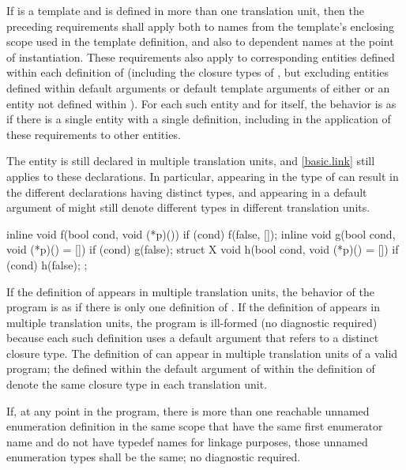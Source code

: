\pnum
If  is a template and is defined in more than one
translation unit, then the preceding requirements
shall apply both to names from the template's enclosing scope used in the
template definition, and also to dependent names at
the point of instantiation.
These requirements also apply to corresponding entities
defined within each definition of 
(including the closure types of ,
but excluding entities defined within default arguments or
default template arguments of either  or
an entity not defined within ).
For each such entity and for  itself,
the behavior is as if there is a single entity with a single definition,
including in the application of these requirements to other entities.
\begin{note}
The entity is still declared in multiple translation units, and \ref{basic.link}
still applies to these declarations. In particular,
appearing in the type of  can result
in the different declarations having distinct types, and
 appearing in a default argument of 
might still denote different types in different translation units.
\end{note}

\pnum
\begin{example}
\begin{codeblock}
inline void f(bool cond, void (*p)()) {
  if (cond) f(false, []{});
}
inline void g(bool cond, void (*p)() = []{}) {
  if (cond) g(false);
}
struct X {
  void h(bool cond, void (*p)() = []{}) {
    if (cond) h(false);
  }
};
\end{codeblock}

If the definition of  appears in multiple translation units,
the behavior of the program is as if
there is only one definition of .
If the definition of  appears in multiple translation units,
the program is ill-formed (no diagnostic required) because
each such definition uses a default argument that
refers to a distinct  closure type.
The definition of  can appear
in multiple translation units of a valid program;
the  defined within
the default argument of  within the definition of 
denote the same closure type in each translation unit.
\end{example}

\pnum
If, at any point in the program,
there is more than one
reachable unnamed enumeration definition in the same scope
that have the same first enumerator name and
do not have typedef names for linkage purposes,
those unnamed enumeration types shall be the same; no diagnostic required.

